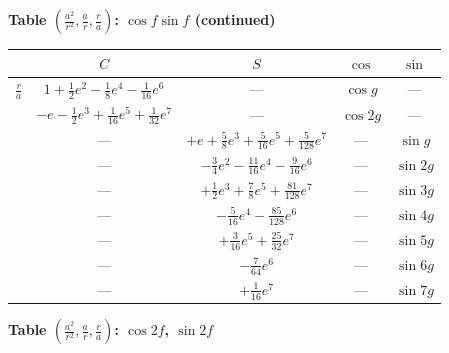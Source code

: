 \documentclass[11pt,a4paper]{article}
\theoremstyle{plain}
\theoremstyle{definition}
\theoremstyle{remark}
\begin{document}
\vspace{1em}

\noindent\textbf{Table $(\frac{a^2}{r^2}, \frac{a}{r}, \frac{r}{a})$: $\cos f \sin f$ (continued)}

\vspace{0.5em}

\begin{center}
\begin{tabular}{|c|c|c|c|c|}
\hline
& $C$ & $S$ & $\cos$ & $\sin$ \\
\hline
$\frac{r}{a}$ & $1 + \frac{1}{2}e^2 - \frac{1}{8}e^4 - \frac{1}{16}e^6$ & --- & $\cos g$ & --- \\
& $-e - \frac{1}{2}e^3 + \frac{1}{16}e^5 + \frac{1}{32}e^7$ & --- & $\cos 2g$ & --- \\
& --- & $+e + \frac{5}{8}e^3 + \frac{5}{16}e^5 + \frac{5}{128}e^7$ & --- & $\sin g$ \\
& --- & $- \frac{3}{4}e^2 - \frac{11}{16}e^4 - \frac{9}{16}e^6$ & --- & $\sin 2g$ \\
& --- & $+ \frac{1}{2}e^3 + \frac{7}{8}e^5 + \frac{81}{128}e^7$ & --- & $\sin 3g$ \\
& --- & $- \frac{5}{16}e^4 - \frac{85}{128}e^6$ & --- & $\sin 4g$ \\
& --- & $+ \frac{3}{16}e^5 + \frac{25}{32}e^7$ & --- & $\sin 5g$ \\
& --- & $- \frac{7}{64}e^6$ & --- & $\sin 6g$ \\
& --- & $+ \frac{1}{16}e^7$ & --- & $\sin 7g$ \\
\hline
\end{tabular}
\end{center}

\vspace{1em}

\noindent\textbf{Table $(\frac{a^2}{r^2}, \frac{a}{r}, \frac{r}{a})$: $\cos 2f$, $\sin 2f$}

\vspace{0.5em}
\end{document}
